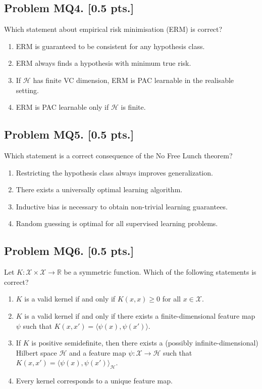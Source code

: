 \documentclass[11pt,a4paper]{article}
\begin{document}
\subsection{Problem MQ4. [0.5 pts.]}
Which statement about empirical risk minimisation (ERM) is correct?
\begin{enumerate}[label=(\alph*)]
    \item ERM is guaranteed to be consistent for any hypothesis class.
    \item ERM always finds a hypothesis with minimum true risk.
    \item If $\mathcal{H}$ has finite VC dimension, ERM is PAC learnable in the realisable setting.
    \item ERM is PAC learnable only if $\mathcal{H}$ is finite.
\end{enumerate}

\subsection{Problem MQ5. [0.5 pts.]}
Which statement is a correct consequence of the No Free Lunch theorem?
\begin{enumerate}[label=(\alph*)]
    \item Restricting the hypothesis class always improves generalization.
    \item There exists a universally optimal learning algorithm.
    \item Inductive bias is necessary to obtain non-trivial learning guarantees.
    \item Random guessing is optimal for all supervised learning problems.
\end{enumerate}

\subsection{Problem MQ6. [0.5 pts.]}
Let $K : \mathcal{X} \times \mathcal{X} \to \mathbb{R}$ be a symmetric function. Which of the following statements is correct?
\begin{enumerate}[label=(\alph*)]
    \item $K$ is a valid kernel if and only if $K(x, x) \ge 0$ for all $x \in \mathcal{X}$.
    \item $K$ is a valid kernel if and only if there exists a finite-dimensional feature map $\psi$ such that $K(x, x') = \langle \psi(x), \psi(x') \rangle$.
    \item If $K$ is positive semidefinite, then there exists a (possibly infinite-dimensional) Hilbert space $\mathcal{H}$ and a feature map $\psi : \mathcal{X} \to \mathcal{H}$ such that $K(x, x') = \langle \psi(x), \psi(x') \rangle_{\mathcal{H}}$.
    \item Every kernel corresponds to a unique feature map.
\end{enumerate}
\end{document}
